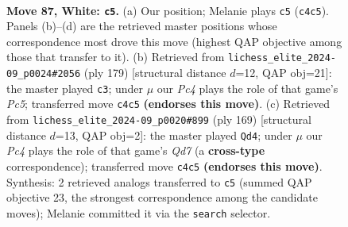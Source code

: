\documentclass[11pt]{article}
\begin{document}
\clearpage

\begin{figure}[p]\centering
\begin{subfigure}{0.46\textwidth}\centering
\resizebox{\linewidth}{!}{%
\newchessgame
\chessboard[
  setfen={8/8/1p6/p7/2P5/2k5/K7/2q5 w - - 30 87},
  showmover=false,
  pgfstyle=straightmove, color=movearrow, markmove={c4-c5}
]}
\caption{}
\end{subfigure}\hfill
\begin{subfigure}{0.46\textwidth}\centering
\resizebox{\linewidth}{!}{%
\newchessgame
\chessboard[
  setfen={8/5k2/1Q6/8/2pK4/8/8/8 b - - 4 90},
  showmover=false,
  pgfstyle=straightmove, color=movearrow, markmove={c4-c3}
]}
\caption{}
\end{subfigure}
\\[4pt]
\begin{subfigure}{0.46\textwidth}\centering
\resizebox{\linewidth}{!}{%
\newchessgame
\chessboard[
  setfen={8/8/4Q1KP/8/8/8/3q4/1k6 b - - 18 85},
  showmover=false,
  pgfstyle=straightmove, color=movearrow, markmove={d2-d4}
]}
\caption{}
\end{subfigure}\hfill

\caption{\textbf{Move 87, White: \texttt{c5}.} (a) Our position; Melanie plays \texttt{c5} (\texttt{c4c5}). Panels (b)--(d) are the retrieved master positions whose correspondence most drove this move (highest QAP objective among those that transfer to it). (b) Retrieved from \texttt{lichess\_elite\_2024-09\_p0024\#2056} (ply 179) [structural distance $d$=12, QAP obj=21]: the master played \texttt{c3}; under $\mu$ our \emph{Pc4} plays the role of that game's \emph{Pc5}; transferred move \texttt{c4c5} \textbf{(endorses this move)}. (c) Retrieved from \texttt{lichess\_elite\_2024-09\_p0020\#899} (ply 169) [structural distance $d$=13, QAP obj=2]: the master played \texttt{Qd4}; under $\mu$ our \emph{Pc4} plays the role of that game's \emph{Qd7} (a \textbf{cross-type} correspondence); transferred move \texttt{c4c5} \textbf{(endorses this move)}. Synthesis: 2 retrieved analogs transferred to \texttt{c5} (summed QAP objective 23, the strongest correspondence among the candidate moves); Melanie committed it via the \texttt{search} selector.}
\label{fig:thought-m172}
\end{figure}
\end{document}
